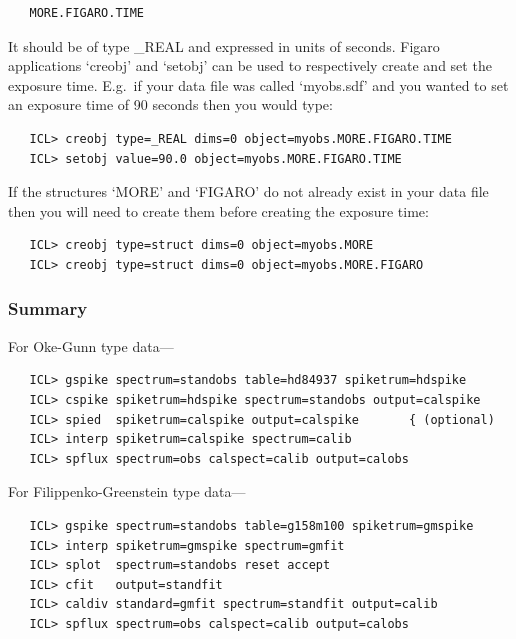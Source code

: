 \documentclass[11pt,twoside]{article}
\newcommand{\latorhtm}[2]{#1}
\newcommand{\latorhtm}[2]{#2}
\begin{document}
\begin{verbatim}
   MORE.FIGARO.TIME
\end{verbatim}

It should be of type \_REAL and expressed in units of seconds.  Figaro
applications `creobj' and `setobj' can be used to respectively create
and set the exposure time.  E.g.\ if your data file was called `myobs.sdf'
and you wanted to set an exposure time of 90 seconds then you would type:

\begin{verbatim}
   ICL> creobj type=_REAL dims=0 object=myobs.MORE.FIGARO.TIME
   ICL> setobj value=90.0 object=myobs.MORE.FIGARO.TIME
\end{verbatim}

If the structures `MORE' and `FIGARO' do not already exist in your
data file then you will need to create them before creating the exposure
time:

\begin{verbatim}
   ICL> creobj type=struct dims=0 object=myobs.MORE
   ICL> creobj type=struct dims=0 object=myobs.MORE.FIGARO
\end{verbatim}


\subsubsection{\label{techno5summary}Summary}

   For Oke-Gunn type data\latorhtm{---}{-}

\begin{verbatim}
   ICL> gspike spectrum=standobs table=hd84937 spiketrum=hdspike
   ICL> cspike spiketrum=hdspike spectrum=standobs output=calspike
   ICL> spied  spiketrum=calspike output=calspike       { (optional)
   ICL> interp spiketrum=calspike spectrum=calib
   ICL> spflux spectrum=obs calspect=calib output=calobs
\end{verbatim}

   For Filippenko-Greenstein type data\latorhtm{---}{-}

\begin{verbatim}
   ICL> gspike spectrum=standobs table=g158m100 spiketrum=gmspike
   ICL> interp spiketrum=gmspike spectrum=gmfit
   ICL> splot  spectrum=standobs reset accept
   ICL> cfit   output=standfit
   ICL> caldiv standard=gmfit spectrum=standfit output=calib
   ICL> spflux spectrum=obs calspect=calib output=calobs
\end{verbatim}
\end{document}
